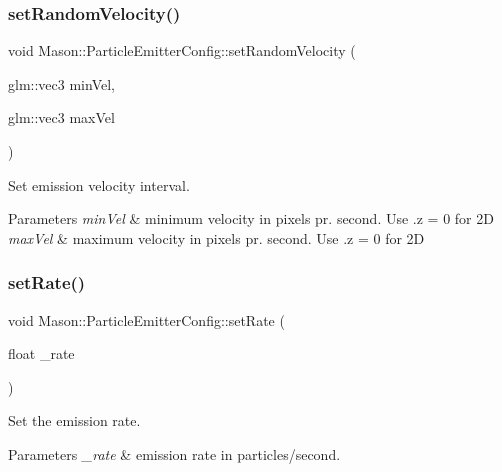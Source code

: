\subsubsection{\texorpdfstring{set\+Random\+Velocity()}{setRandomVelocity()}}
{\footnotesize\ttfamily void Mason\+::\+Particle\+Emitter\+Config\+::set\+Random\+Velocity (\begin{DoxyParamCaption}\item[{glm\+::vec3}]{min\+Vel,  }\item[{glm\+::vec3}]{max\+Vel }\end{DoxyParamCaption})\hspace{0.3cm}{\ttfamily [inline]}}



Set emission velocity interval. 


\begin{DoxyParams}{Parameters}
{\em min\+Vel} & minimum velocity in pixels pr. second. Use .z = 0 for 2D \\
\hline
{\em max\+Vel} & maximum velocity in pixels pr. second. Use .z = 0 for 2D \\
\hline
\end{DoxyParams}
\hypertarget{struct_mason_1_1_particle_emitter_config_a8569c3e45131fd9d51687bbf293e3154}{}\label{struct_mason_1_1_particle_emitter_config_a8569c3e45131fd9d51687bbf293e3154} 
\subsubsection{\texorpdfstring{set\+Rate()}{setRate()}}
{\footnotesize\ttfamily void Mason\+::\+Particle\+Emitter\+Config\+::set\+Rate (\begin{DoxyParamCaption}\item[{float}]{\+\_\+rate }\end{DoxyParamCaption})\hspace{0.3cm}{\ttfamily [inline]}}



Set the emission rate. 


\begin{DoxyParams}{Parameters}
{\em \+\_\+rate} & emission rate in particles/second. \\
\hline
\end{DoxyParams}
\hypertarget{struct_mason_1_1_particle_emitter_config_aaf515319a62060a75edbb1e7b6403ff2}{}\label{struct_mason_1_1_particle_emitter_config_aaf515319a62060a75edbb1e7b6403ff2} 
